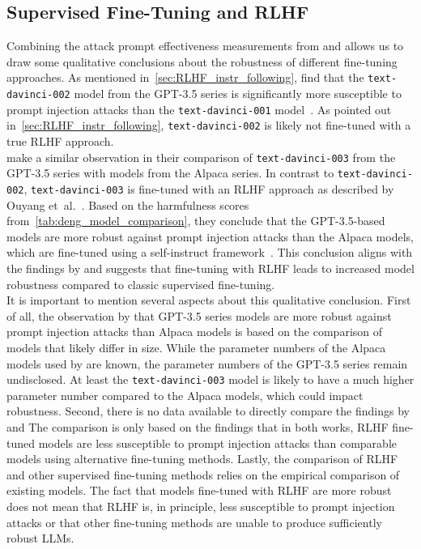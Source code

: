 \subsection{Supervised Fine-Tuning and RLHF}
Combining the attack prompt effectiveness measurements from \perez and \deng allows us to draw some qualitative conclusions about the robustness of different fine-tuning approaches.
As mentioned in~\cref{sec:RLHF_instr_following}, \perez find that the \texttt{text-davinci-002} model from the GPT-3.5 series is significantly more susceptible to prompt injection attacks than the \texttt{text-davinci-001} model~\cite{perez_ignore_2022}.
As pointed out in~\cref{sec:RLHF_instr_following}, \texttt{text-davinci-002} is likely not fine-tuned with a true RLHF approach.\\

\deng make a similar observation in their comparison of \texttt{text-davinci-003} from the GPT-3.5 series with models from the Alpaca series.
In contrast to \texttt{text-davinci-002}, \texttt{text-davinci-003} is fine-tuned with an RLHF approach as described by Ouyang et~al.~\cite{janus_update_2022}.
Based on the harmfulness scores from~\cref{tab:deng_model_comparison}, they conclude that the GPT-3.5-based models are more robust against prompt injection attacks than the Alpaca models, which are fine-tuned using a self-instruct framework~\cite{wang_self-instruct_2023}.
This conclusion aligns with the findings by \perez and suggests that fine-tuning with RLHF leads to increased model robustness compared to classic supervised fine-tuning.\\

It is important to mention several aspects about this qualitative conclusion.
First of all, the observation by \deng that GPT-3.5 series models are more robust against prompt injection attacks than Alpaca models is based on the comparison of models that likely differ in size.
While the parameter numbers of the Alpaca models used by \deng are known, the parameter numbers of the GPT-3.5 series remain undisclosed.
At least the \texttt{text-davinci-003} model is likely to have a much higher parameter number compared to the Alpaca models, which could impact robustness.
Second, there is no data available to directly compare the findings by \perez and \deng
The comparison is only based on the findings that in both works, RLHF fine-tuned models are less susceptible to prompt injection attacks than comparable models using alternative fine-tuning methods.
Lastly, the comparison of RLHF and other supervised fine-tuning methods relies on the empirical comparison of existing models.
The fact that models fine-tuned with RLHF are more robust does not mean that RLHF is, in principle, less susceptible to prompt injection attacks or that other fine-tuning methods are unable to produce sufficiently robust LLMs.